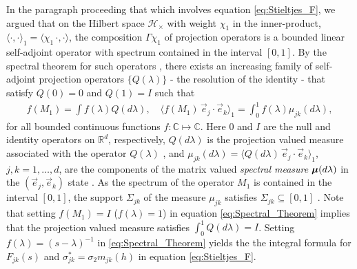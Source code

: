 \documentclass{cmslatex}
\newcommand\bmu{\mbox{\boldmath${\mu}$}}
\begin{document}
In the paragraph proceeding that which involves equation
\eqref{eq:Stieltjes_F}, we argued that on the Hilbert space
$\mathscr{H}_\times$ with weight $\chi_1$ in the inner-product,
$\langle\cdot,\cdot\rangle_1=\langle\chi_1\,\cdot,\cdot\rangle$, the composition $\Gamma\chi_1$ of projection operators
is a bounded linear self-adjoint operator with spectrum contained in
the interval $[0,1]$. By the spectral theorem for such
operators \cite{Reed-1980,Stone:64}, there exists an increasing family
of self-adjoint projection operators $\{Q(\lambda)\}$ - the resolution of the
identity - that satisfy $Q(0)=0$ and $Q(1)=I$ such that 
% 
\begin{align}\label{eq:Spectral_Theorem}
  f(M_1)=\int f(\lambda)Q(d\lambda), \quad
  \langle f(M_1)\,\vec{e}_j\cdot\vec{e}_k\rangle_1= \int_0^1f(\lambda)\mu_{jk}(d\lambda), 
\end{align}
%
for all bounded continuous functions $f:\mathbb{C}\mapsto\mathbb{C}$. Here
$0$ and $I$ are the null and identity operators on $\mathbb{R}^d$,
respectively, $Q(d\lambda)$ is the projection valued measure associated with 
the operator $Q(\lambda)$ \cite{Reed-1980}, and
$\mu_{jk}(d\lambda)=\langle Q(d\lambda)\,\vec{e}_j\cdot\vec{e}_k\rangle_1$, $j,k=1,\ldots,d$, are the
components of the matrix valued \emph{spectral measure} $\bmu(d\lambda)$ in
the $(\vec{e}_j,\vec{e}_k)$ state
\cite{Golden:CMP-473,Reed-1980,Stone:64}. As the spectrum of the
operator $M_1$ is contained in the interval $[0,1]$, the support
$\Sigma_{jk}$ of the measure $\mu_{jk}$ satisfies $\Sigma_{jk}\subseteq[0,1]$
\cite{Reed-1980}. Note that setting $f(M_1)=I$ ($f(\lambda)=1$) in equation
\eqref{eq:Spectral_Theorem} implies that the projection valued measure
satisfies $\int_0^1Q(d\lambda)=I$. Setting $f(\lambda)=(s-\lambda)^{-1}$ in
\eqref{eq:Spectral_Theorem} yields the the integral formula for
$F_{jk}(s)$ and $\sigma_{jk}^*=\sigma_2m_{jk}(h)$ in equation \eqref{eq:Stieltjes_F}.
\end{document}
